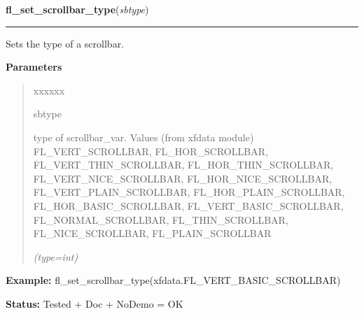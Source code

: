 \hspace{.8\funcindent}\begin{boxedminipage}{\funcwidth}

    \raggedright \textbf{fl\_set\_scrollbar\_type}(\textit{sbtype})

    \vspace{-1.5ex}

    \rule{\textwidth}{0.5\fboxrule}
\setlength{\parskip}{2ex}
    Sets the type of a scrollbar.

\setlength{\parskip}{1ex}
      \textbf{Parameters}
      \vspace{-1ex}

      \begin{quote}
        \begin{Ventry}{xxxxxx}

          \item[sbtype]

          type of scrollbar\_var. Values (from xfdata module) 
          FL\_VERT\_SCROLLBAR, FL\_HOR\_SCROLLBAR, 
          FL\_VERT\_THIN\_SCROLLBAR, FL\_HOR\_THIN\_SCROLLBAR, 
          FL\_VERT\_NICE\_SCROLLBAR, FL\_HOR\_NICE\_SCROLLBAR, 
          FL\_VERT\_PLAIN\_SCROLLBAR, FL\_HOR\_PLAIN\_SCROLLBAR, 
          FL\_HOR\_BASIC\_SCROLLBAR, FL\_VERT\_BASIC\_SCROLLBAR, 
          FL\_NORMAL\_SCROLLBAR, FL\_THIN\_SCROLLBAR, FL\_NICE\_SCROLLBAR, 
          FL\_PLAIN\_SCROLLBAR

            {\it (type=int)}

        \end{Ventry}

      \end{quote}

\textbf{Example:} fl\_set\_scrollbar\_type(xfdata.FL\_VERT\_BASIC\_SCROLLBAR)



\textbf{Status:} Tested + Doc + NoDemo = OK



    \end{boxedminipage}

    \label{xformslib:flbasic:fl_set_thinscrollbar}

    \vspace{0.5ex}

